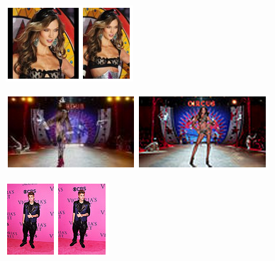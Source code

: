 \begin{figure}[h!]
  \centering
  \includegraphics[width=1.0\linewidth]{./zoom.png}
  \caption[]{}
  \label{fig:}
\end{figure}

\begin{figure}[h!]
  \centering
  \includegraphics[width=1.0\linewidth]{./stage.png}
  \caption[]{}
  \label{fig:}
\end{figure}

\begin{figure}[h!]
  \centering
  \includegraphics[width=1.0\linewidth]{./bieber.png}
  \caption[]{}
  \label{fig:}
\end{figure}

